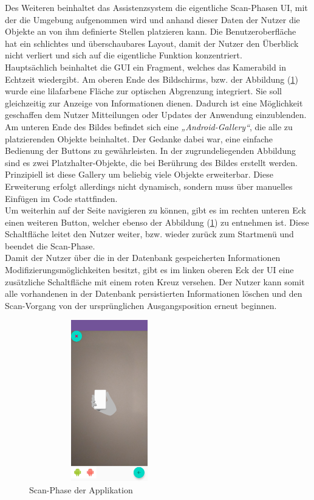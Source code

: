 Des Weiteren beinhaltet das Assistenzsystem die eigentliche Scan-Phasen \acs{UI}, mit der die Umgebung aufgenommen wird und anhand dieser Daten 
der Nutzer die Objekte an von ihm definierte Stellen platzieren kann. Die Benutzeroberfläche hat ein schlichtes und überschaubares Layout, damit der Nutzer den 
Überblick nicht verliert und sich auf die eigentliche Funktion konzentriert. 
\\ 
Hauptsächlich beinhaltet die \acs{GUI} ein Fragment, welches das Kamerabild in Echtzeit wiedergibt. Am oberen Ende des Bildschirms, bzw. der Abbildung 
(\ref{pic:scan}) wurde eine lilafarbene Fläche zur optischen Abgrenzung integriert. Sie soll gleichzeitig zur Anzeige von Informationen dienen. Dadurch ist eine 
Möglichkeit geschaffen dem Nutzer Mitteilungen oder Updates der Anwendung einzublenden. 
\\ 
Am unteren Ende des Bildes befindet sich eine \textit{„Android-Gallery“}, die alle zu platzierenden Objekte beinhaltet. Der Gedanke dabei war, eine einfache 
Bedienung der Buttons zu gewährleisten. In der zugrundeliegenden Abbildung sind es zwei Platzhalter-Objekte, die bei Berührung des Bildes erstellt werden. 
Prinzipiell ist diese Gallery um beliebig viele Objekte erweiterbar. Diese Erweiterung erfolgt allerdings nicht dynamisch, sondern muss über manuelles 
Einfügen im Code stattfinden. 
\\ 
\linebreak
Um weiterhin auf der Seite navigieren zu können, gibt es im rechten unteren Eck einen weiteren Button, welcher ebenso der Abbildung (\ref{pic:scan}) 
zu entnehmen ist. Diese Schaltfläche leitet den Nutzer weiter, bzw. wieder zurück zum Startmenü und beendet die Scan-Phase. 
\\ 
\linebreak
Damit der Nutzer über die in der Datenbank gespeicherten Informationen Modifizierungsmöglichkeiten besitzt, gibt es im linken oberen Eck der \acs{UI} eine 
zusätzliche Schaltfläche mit einem roten Kreuz versehen. Der Nutzer kann somit alle vorhandenen in der Datenbank persistierten Informationen löschen 
und den Scan-Vorgang von der ursprünglichen Ausgangsposition erneut beginnen. %
\begin{figure}[hbt!]
    \centering
    \includegraphics[width=7cm,height=7cm,keepaspectratio]{4Umsetzung/Bilder/scan-phase.jpg}
    \caption{Scan-Phase der Applikation}
    \label{pic:scan}
\end{figure}
